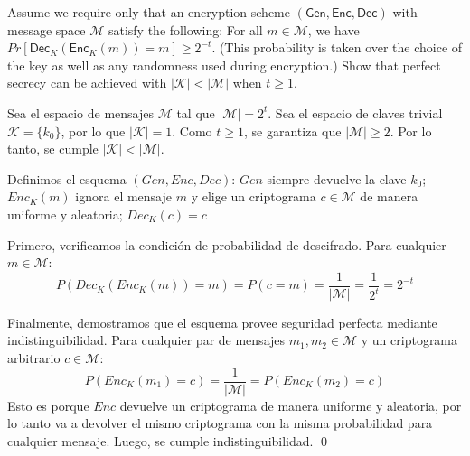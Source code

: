 \documentclass[12pt,addpoints,answers]{exam}
\begin{document}
\begin{questions}
\begin{solution}
\end{solution}


\question [10] Assume we require only that an encryption scheme $(\mathsf{Gen}, \mathsf{Enc},\mathsf{Dec})$ with message space $\mathcal{M}$ satisfy the following: For all $m \in \mathcal{M}$, we have $Pr[\mathsf{Dec}_K(\mathsf{Enc}_K(m)) = m] \geq 2^{-t}$. (This probability is taken over the choice of the key as well as any randomness used during encryption.) Show that perfect secrecy can be achieved with $|\mathcal{K}| < |\mathcal{M}|$ when $t\geq 1$. 

\begin{solution}
    Sea el espacio de mensajes $\mathcal{M}$ tal que $|\mathcal{M}| = 2^t$. 
    Sea el espacio de claves trivial $\mathcal{K} = \{k_0\}$, por lo que $|\mathcal{K}| = 1$. 
    Como $t \ge 1$, se garantiza que $|\mathcal{M}| \ge 2$. Por lo tanto, se cumple $|\mathcal{K}| < |\mathcal{M}|$.
    
    Definimos el esquema $(Gen, Enc, Dec)$: $Gen$ siempre devuelve la clave $k_0$; $Enc_K(m)$ ignora el mensaje $m$ y elige un criptograma $c \in \mathcal{M}$ de manera uniforme y aleatoria; $Dec_K(c) = c$ 
    
    Primero, verificamos la condición de probabilidad de descifrado. Para cualquier $m \in \mathcal{M}$:
    $$P(Dec_K(Enc_K(m)) = m) = P(c = m) = \frac{1}{|\mathcal{M}|} = \frac{1}{2^t} = 2^{-t}$$
    
    Finalmente, demostramos que el esquema provee seguridad perfecta mediante indistinguibilidad. Para cualquier par de mensajes $m_1, m_2 \in \mathcal{M}$ y un criptograma arbitrario $c \in \mathcal{M}$:
    $$P(Enc_K(m_1) = c) = \frac{1}{|\mathcal{M}|} = P(Enc_K(m_2) = c)$$
    Esto es porque $Enc$ devuelve un criptograma de manera uniforme y aleatoria, por lo tanto va a devolver el mismo criptograma con la misma probabilidad para cualquier mensaje.
    Luego, se cumple indistinguibilidad. 
    \qed
\end{solution}

\end{questions}
\end{document}
